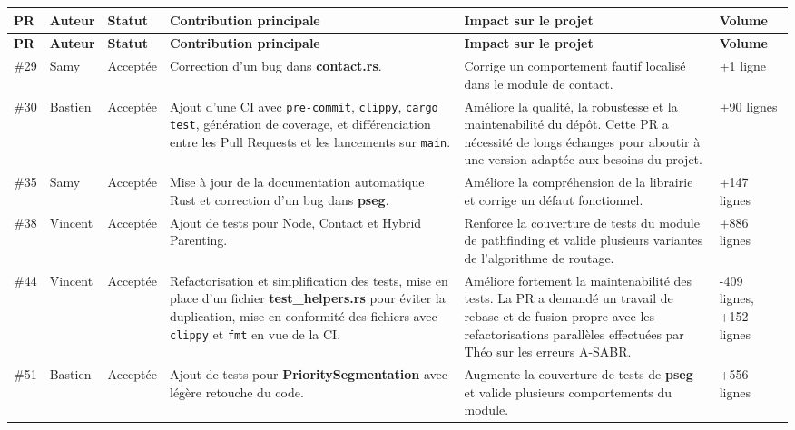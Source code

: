 \documentclass{article}
\begin{document}
\begin{longtable}{|p{}|p{}|p{}|p{}|p{}|p{}|}
\hline
\textbf{PR} & \textbf{Auteur} & \textbf{Statut} & \textbf{Contribution principale} & \textbf{Impact sur le projet} & \textbf{Volume} \\
\hline
\endfirsthead

\hline
\textbf{PR} & \textbf{Auteur} & \textbf{Statut} & \textbf{Contribution principale} & \textbf{Impact sur le projet} & \textbf{Volume} \\
\hline
\endhead

\#29 & Samy & Acceptée
& Correction d’un bug dans \textbf{contact.rs}.
& Corrige un comportement fautif localisé dans le module de contact.
& +1 ligne \\
\hline

\#30 & Bastien & Acceptée
& Ajout d’une CI avec \texttt{pre-commit}, \texttt{clippy}, \texttt{cargo test}, génération de coverage, et différenciation entre les Pull Requests et les lancements sur \texttt{main}.
& Améliore la qualité, la robustesse et la maintenabilité du dépôt. Cette PR a nécessité de longs échanges pour aboutir à une version adaptée aux besoins du projet.
& +90 lignes \\
\hline

\#35 & Samy & Acceptée
& Mise à jour de la documentation automatique Rust et correction d’un bug dans \textbf{pseg}.
& Améliore la compréhension de la librairie et corrige un défaut fonctionnel.
& +147 lignes \\
\hline

\#38 & Vincent & Acceptée
& Ajout de tests pour Node, Contact et Hybrid Parenting.
& Renforce la couverture de tests du module de pathfinding et valide plusieurs variantes de l’algorithme de routage.
& +886 lignes \\
\hline

\#44 & Vincent & Acceptée
& Refactorisation et simplification des tests, mise en place d’un fichier \textbf{test\_helpers.rs} pour éviter la duplication, mise en conformité des fichiers avec \texttt{clippy} et \texttt{fmt} en vue de la CI.
& Améliore fortement la maintenabilité des tests. La PR a demandé un travail de rebase et de fusion propre avec les refactorisations parallèles effectuées par Théo sur les erreurs A-SABR.
& -409 lignes, +152 lignes \\
\hline

\#51 & Bastien & Acceptée
& Ajout de  tests pour \textbf{PrioritySegmentation} avec légère retouche du code.
& Augmente la couverture de tests de \textbf{pseg} et valide plusieurs comportements du module.
& +556 lignes \\
\hline


\end{longtable}
\end{document}
